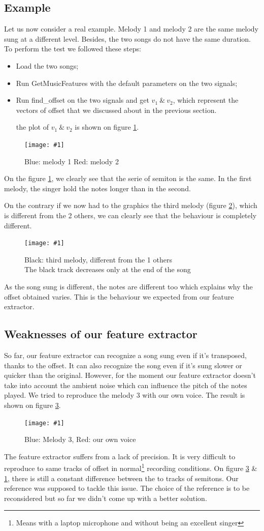 \documentclass[a4paper]{report}
\newcommand{\img}[3]{\begin{figure}[!h] \centering \texttt{[image: \#1]}\captionsetup{justification=centering} \caption{#3} \label{#1} \end{figure}}
\begin{document}
\subsection{Example}
Let us now consider a real example. Melody 1 and melody 2 are the same melody sung at a different level. Besides, the two songs do not have the same duration.
To perform the test we followed these steps: \begin{itemize}
\item Load the two songs;
\item Run GetMusicFeatures with the default parameters on the two signals;
\item Run find\_offset on the two signals and get $v_{1}~\&~v_{2}$, which represent the vectors of offset that we discussed about in the previous section.

the plot of $v_{1}~\&~v_{2}$ is shown on figure \ref{test_extractor}.
\end{itemize}
\img{test_extractor}{.45}{ {\color{blue}Blue: melody 1} {\color{red}Red: melody 2}}
On the figure \ref{test_extractor}, we clearly see that the serie of semiton is the same. In the first melody, the singer hold the notes longer than in the second.


On the contrary if we now had to the graphics the third melody (figure \ref{Comparison_3_songs}), which is different from the 2 others, we can clearly see that the behaviour is completely different. 
\img{Comparison_3_songs}{0.5}{Black: third melody, different from the  1 others\\The black track decreases only at the end of the song}

As the song sung is different, the notes are different too which explains why the offset obtained varies. This is the behaviour we expected from our feature extractor.

\pagebreak
\subsection{Weaknesses of our feature extractor}

So far, our feature extractor can recognize a song sung even if it's transposed, thanks to the offset. It can also recognize the song even if it's sung slower or quicker than the original. However, for the moment our feature extractor doesn't take into account the ambient noise which can influence the pitch of the notes played.
We tried to reproduce the melody 3 with our own voice. The result is shown on figure \ref{melody3_experience}.

\img{melody3_experience}{.3}{{\color{blue}Blue: Melody 3}, {\color{red}Red: our own voice}}
The feature extractor suffers from a lack of precision. It is very difficult to reproduce to same tracks of offset in normal\footnote{Means with a laptop microphone and without being an excellent singer} recording conditions. On figure \ref{melody3_experience} \& \ref{test_extractor}, there is still a constant difference between the to tracks of semitons. Our reference was supposed to tackle this issue. The choice of the reference is to be reconsidered but so far we didn't come up with a better solution.
\end{document}
